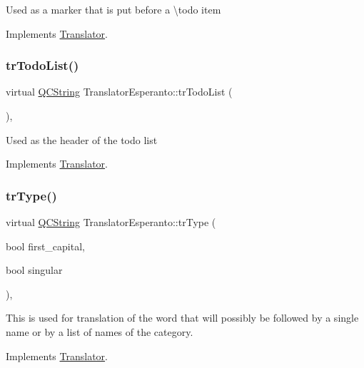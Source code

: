 Used as a marker that is put before a \textbackslash{}todo item 

Implements \mbox{\hyperlink{class_translator}{Translator}}.

\mbox{\label{class_translator_esperanto_adee876dc6b5451cee57c7f9fe6741ef7}} 
\subsubsection{\texorpdfstring{trTodoList()}{trTodoList()}}
{\footnotesize\ttfamily virtual \mbox{\hyperlink{class_q_c_string}{Q\+C\+String}} Translator\+Esperanto\+::tr\+Todo\+List (\begin{DoxyParamCaption}{ }\end{DoxyParamCaption})\hspace{0.3cm}{\ttfamily [inline]}, {\ttfamily [virtual]}}

Used as the header of the todo list 

Implements \mbox{\hyperlink{class_translator}{Translator}}.

\mbox{\label{class_translator_esperanto_aae2b9f269ff0e15114595963a0c69668}} 
\subsubsection{\texorpdfstring{trType()}{trType()}}
{\footnotesize\ttfamily virtual \mbox{\hyperlink{class_q_c_string}{Q\+C\+String}} Translator\+Esperanto\+::tr\+Type (\begin{DoxyParamCaption}\item[{bool}]{first\+\_\+capital,  }\item[{bool}]{singular }\end{DoxyParamCaption})\hspace{0.3cm}{\ttfamily [inline]}, {\ttfamily [virtual]}}

This is used for translation of the word that will possibly be followed by a single name or by a list of names of the category. 

Implements \mbox{\hyperlink{class_translator}{Translator}}.

\mbox{\label{class_translator_esperanto_a1b9dc9900d36bd5378d34c9ba0af613f}} 

